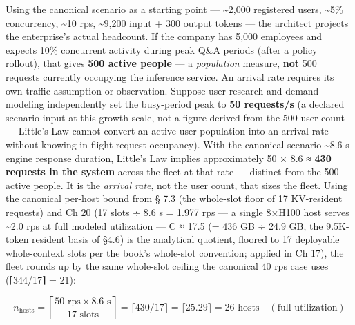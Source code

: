 Using the canonical scenario as a starting point ---
\textasciitilde2,000 registered users, \textasciitilde5\% concurrency,
\textasciitilde10 rps, \textasciitilde9,200 input + 300 output tokens
--- the architect projects the enterprise's actual headcount. If the
company has 5,000 employees and expects 10\% concurrent activity during
peak Q\&A periods (after a policy rollout), that gives \textbf{500
active people} --- a \emph{population} measure, \textbf{not} 500
requests currently occupying the inference service. An arrival rate
requires its own traffic assumption or observation. Suppose user
research and demand modeling independently set the busy-period peak to
\textbf{50 requests/s} (a declared scenario input at this growth scale,
not a figure derived from the 500-user count --- Little's Law cannot
convert an active-user population into an arrival rate without knowing
in-flight request occupancy). With the canonical-scenario
\textasciitilde8.6 s engine response duration, Little's Law implies
approximately 50 × 8.6 ≈ \textbf{430 requests in the system} across the
fleet at that rate --- distinct from the 500 active people. It is the
\emph{arrival rate}, not the user count, that sizes the fleet. Using the
canonical per-host bound from § 7.3 (the whole-slot floor of 17
KV-resident requests) and Ch 20 (17 slots ÷ 8.6 s = 1.977 rps --- a
single 8×H100 host serves \textasciitilde2.0 rps at full modeled
utilization --- C ≈ 17.5 (= 436 GB ÷ 24.9 GB, the 9.5K-token resident
basis of §4.6) is the analytical quotient, floored to 17 deployable
whole-context slots per the book's whole-slot convention; applied in Ch
17), the fleet rounds up by the same whole-slot ceiling the canonical 40
rps case uses (⌈344/17⌉ = 21):

\[
n_\text{hosts} = \left\lceil \frac{50 \text{ rps} \times 8.6 \text{ s}}{17 \text{ slots}} \right\rceil = \lceil 430/17 \rceil = \lceil 25.29 \rceil = 26 \text{ hosts} \quad (\text{full utilization})
\]

